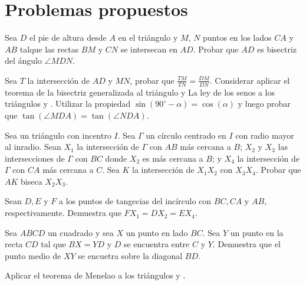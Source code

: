 \section{Problemas propuestos}

\begin{section-problem}
    Sea $D$ el pie de altura desde $A$ en el triángulo  y $M$, $N$ puntos en los lados $CA$ y $AB$ talque las rectas $BM$ y $CN$ se intersecan en $AD$.
    Probar que $AD$ es bisectriz del ángulo $\angle MDN$.
\end{section-problem}

\begin{hint}
    Sea $T$ la intersección de $AD$ y $MN$, probar que $\frac{TM}{TN} = \frac{DM}{DN}$.
    Considerar aplicar el teorema de la bisectriz generalizada al triángulo  y La ley de los senos a los triángulos  y .
    Utilizar la propiedad $\sin(90^\circ - \alpha) = \cos(\alpha)$ y luego probar que $\tan(\angle MDA) = \tan(\angle NDA)$.
\end{hint}


\begin{section-problem}
    Sea  un triángulo con incentro $I$.
    Sea $\Gamma$ un círculo centrado en $I$ con radio mayor al inradio.
    Sean $X_1$ la intersección de $\Gamma$ con $AB$ más cercana a $B$; $X_2$ y $X_3$ las intersecciones de $\Gamma$ con $BC$ donde $X_2$ es más cercana a $B$; y $X_4$ la intersección de $\Gamma$ con $CA$ más cercana a $C$.
    Sea $K$ la intersección de $X_1 X_2$ con $X_3 X_4$.
    Probar que $AK$ biseca $X_2 X_3$.
\end{section-problem}

\begin{hint}
    Sean $D, E$ y $F$ a los puntos de tangecias del incírculo con $BC, CA$ y $AB$, respectivamente.
    Demuestra que $FX_1 = DX_2 = EX_4$.
\end{hint}


\begin{section-problem}
    Sea $ABCD$ un cuadrado y sea $X$ un punto en lado $BC$.
    Sea $Y$ un punto en la recta $CD$ tal que $BX = YD$ y $D$ se encuentra entre $C$ y $Y$.
    Demuestra que el punto medio de $XY$ se encuetra sobre la diagonal $BD$.
\end{section-problem}

\begin{hint}
    Aplicar el teorema de Menelao a los triángulos  y .
\end{hint}


